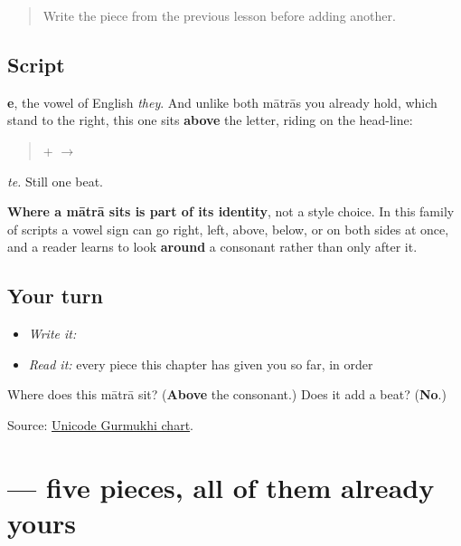 \label{lesson:PA-W01-e-matra}



\begin{quote}
Write the piece from the previous lesson before adding another.
\end{quote}

\subsection*{Script}
\begin{quote}
\end{quote}

\textbf{e}, the vowel of English \emph{they}. And unlike both mātrās you already hold, which stand to the right, this one sits \textbf{above} the letter, riding on the head-line:

\begin{quote}
\textbf{} + \textbf{} $\to$ \textbf{}
\end{quote}

\emph{te.} Still one beat.

\textbf{Where a mātrā sits is part of its identity}, not a style choice. In this family of scripts a vowel sign can go right, left, above, below, or on both sides at once, and a reader learns to look \textbf{around} a consonant rather than only after it.

\subsection*{Your turn}
\begin{itemize}
\raggedright
  \item \emph{Write it:} 
  \item \emph{Read it:} every piece this chapter has given you so far, in order
\end{itemize}

\begin{tcolorbox}[breakable,colback=teal!4,colframe=teal!35!black,title={Before you move on}]
Where does this mātrā sit? (\textbf{Above} the consonant.) Does it add a beat? (\textbf{No}.)

Source: \href{https://www.unicode.org/charts/PDF/U0A00.pdf}{Unicode Gurmukhi chart}.
\end{tcolorbox}
\section[\texorpdfstring{\pa{ਨਮਸਤੇ} (namaste)}{ਨਮਸਤੇ (namaste)}]{ — five pieces, all of them already yours}

